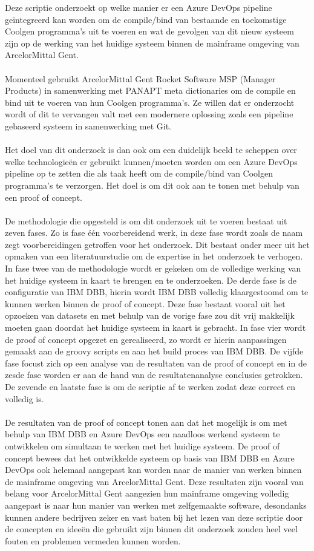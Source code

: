 Deze scriptie onderzoekt op welke manier er een Azure DevOps pipeline geïntegreerd kan worden om de compile/bind van bestaande en toekomstige Coolgen programma's uit te voeren en wat de gevolgen van dit nieuw systeem zijn op de werking van het huidige systeem binnen de mainframe omgeving van ArcelorMittal Gent. 
\\ \\
Momenteel gebruikt ArcelorMittal Gent Rocket Software MSP (Manager Products) in samenwerking met PANAPT meta dictionaries om de compile en bind uit te voeren van hun Coolgen programma's. Ze willen dat er onderzocht wordt of dit te vervangen valt met een modernere oplossing zoals een pipeline gebaseerd systeem in samenwerking met Git.
\\ \\
Het doel van dit onderzoek is dan ook om een duidelijk beeld te scheppen over welke technologieën er gebruikt kunnen/moeten worden om een Azure DevOps pipeline op te zetten die als taak heeft om de compile/bind van Coolgen programma's te verzorgen. Het doel is om dit ook aan te tonen met behulp van een proof of concept. 
\\ \\ 
De methodologie die opgesteld is om dit onderzoek uit te voeren bestaat uit zeven fases. Zo is fase één voorbereidend werk, in deze fase wordt zoals de naam zegt voorbereidingen getroffen voor het onderzoek. Dit bestaat onder meer uit het opmaken van een literatuurstudie om de expertise in het onderzoek te verhogen. In fase twee van de methodologie wordt er gekeken om de volledige werking van het huidige systeem in kaart te brengen en te onderzoeken. De derde fase is de configuratie van IBM DBB, hierin wordt IBM DBB volledig klaargestoomd om te kunnen werken binnen de proof of concept. Deze fase bestaat vooral uit het opzoeken van datasets en met behulp van de vorige fase zou dit vrij makkelijk moeten gaan doordat het huidige systeem in kaart is gebracht. In fase vier wordt de proof of concept opgezet en gerealiseerd, zo wordt er hierin aanpassingen gemaakt aan de groovy scripts en aan het build proces van IBM DBB. De vijfde fase focust zich op een analyse van de resultaten van de proof of concept en in de zesde fase worden er aan de hand van de resultatenanalyse conclusies getrokken. De zevende en laatste fase is om de scriptie af te werken zodat deze correct en volledig is. 
\\ \\
De resultaten van de proof of concept tonen aan dat het mogelijk is om met behulp van IBM DBB en Azure DevOps een naadloos werkend systeem te ontwikkelen om simultaan te werken met het huidige systeem. De proof of concept bewees dat het ontwikkelde systeem op basis van IBM DBB en Azure DevOps ook helemaal aangepast kan worden naar de manier van werken binnen de mainframe omgeving van ArcelorMittal Gent. Deze resultaten zijn vooral van belang voor ArcelorMittal Gent aangezien hun mainframe omgeving volledig aangepast is naar hun manier van werken met zelfgemaakte software, desondanks kunnen andere bedrijven zeker en vast baten bij het lezen van deze scriptie door de concepten en ideeën die gebruikt zijn binnen dit onderzoek zouden heel veel fouten en problemen vermeden kunnen worden. 
